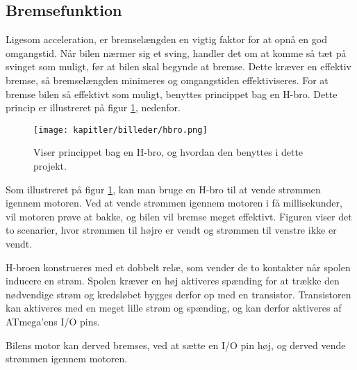 \subsection{Bremsefunktion}
Ligesom acceleration, er bremselængden en vigtig faktor for at opnå en god omgangstid.
Når bilen nærmer sig et sving, handler det om at komme så tæt på svinget som muligt, før at bilen
skal begynde at bremse. Dette kræver en effektiv bremse, så bremselængden minimeres og omgangstiden effektiviseres.
For at bremse bilen så effektivt som muligt, benyttes princippet bag en H-bro. Dette princip er illustreret
på figur \ref{fig:hbro}, nedenfor.

\begin{figure}[ht]
    \centering
    \texttt{[image: kapitler/billeder/hbro.png]}
    \caption{Viser princippet bag en H-bro, og hvordan den benyttes i dette projekt.}
    \label{fig:hbro}
\end{figure}

Som illustreret på figur \ref{fig:hbro}, kan man bruge en H-bro til at vende strømmen igennem motoren.
Ved at vende strømmen igennem motoren i få millisekunder, vil motoren prøve at bakke,
og bilen vil bremse meget effektivt. Figuren viser det to scenarier, hvor strømmen til højre er vendt
og strømmen til venstre ikke er vendt.

H-broen konstrueres med et dobbelt relæ, som vender de to kontakter når spolen inducere en strøm.
Spolen kræver en høj aktiveres spænding for at trække den nødvendige strøm
og kredsløbet bygges derfor op med en transistor.
Transistoren kan aktiveres med en meget lille strøm og spænding, og kan derfor aktiveres
af ATmega'ens I/O pins.

Bilens motor kan derved bremses, ved at sætte en I/O pin høj, og derved vende strømmen igennem motoren.
